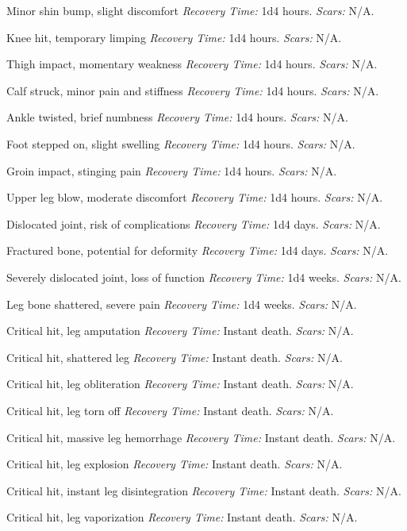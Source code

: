 \documentclass[12pt]{book}  %
\begin{document}
\begin{description}[labelwidth=1.5em, leftmargin=*, itemsep=0.4em]
    \item[1 -] Minor shin bump, slight discomfort \textit{Recovery Time:} 1d4 hours. \textit{Scars:} N/A.
    \item[2 -] Knee hit, temporary limping \textit{Recovery Time:} 1d4 hours. \textit{Scars:} N/A.
    \item[3 -] Thigh impact, momentary weakness \textit{Recovery Time:} 1d4 hours. \textit{Scars:} N/A.
    \item[4 -] Calf struck, minor pain and stiffness \textit{Recovery Time:} 1d4 hours. \textit{Scars:} N/A.
    \item[5 -] Ankle twisted, brief numbness \textit{Recovery Time:} 1d4 hours. \textit{Scars:} N/A.
    \item[6 -] Foot stepped on, slight swelling \textit{Recovery Time:} 1d4 hours. \textit{Scars:} N/A.
    \item[7 -] Groin impact, stinging pain \textit{Recovery Time:} 1d4 hours. \textit{Scars:} N/A.
    \item[8 -] Upper leg blow, moderate discomfort \textit{Recovery Time:} 1d4 hours. \textit{Scars:} N/A.
    \item[9 -] Dislocated joint, risk of complications \textit{Recovery Time:} 1d4 days. \textit{Scars:} N/A.
    \item[10 -] Fractured bone, potential for deformity \textit{Recovery Time:} 1d4 days. \textit{Scars:} N/A.
    \item[11 -] Severely dislocated joint, loss of function \textit{Recovery Time:} 1d4 weeks. \textit{Scars:} N/A.
    \item[12 -] Leg bone shattered, severe pain \textit{Recovery Time:} 1d4 weeks. \textit{Scars:} N/A.
    \item[13 -] Critical hit, leg amputation \textit{Recovery Time:} Instant death. \textit{Scars:} N/A.
    \item[14 -] Critical hit, shattered leg \textit{Recovery Time:} Instant death. \textit{Scars:} N/A.
    \item[15 -] Critical hit, leg obliteration \textit{Recovery Time:} Instant death. \textit{Scars:} N/A.
    \item[16 -] Critical hit, leg torn off \textit{Recovery Time:} Instant death. \textit{Scars:} N/A.
    \item[17 -] Critical hit, massive leg hemorrhage \textit{Recovery Time:} Instant death. \textit{Scars:} N/A.
    \item[18 -] Critical hit, leg explosion \textit{Recovery Time:} Instant death. \textit{Scars:} N/A.
    \item[19 -] Critical hit, instant leg disintegration \textit{Recovery Time:} Instant death. \textit{Scars:} N/A.
    \item[20 -] Critical hit, leg vaporization \textit{Recovery Time:} Instant death. \textit{Scars:} N/A.
\end{description}
\end{document}
